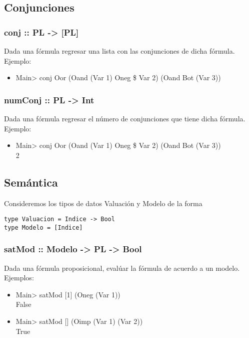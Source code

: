 \documentclass[11pt]{article}
\begin{document}
\subsection{Conjunciones}
\label{sec:orga60673c}
\subsubsection{conj :: PL -> [PL]}
\label{sec:org50aaf73}
Dada una fórmula regresar una lista con las conjunciones de dicha fórmula.\\
Ejemplo: 
\begin{itemize}
\item Main> conj Oor (Oand (Var 1) Oneg \$ Var 2) (Oand Bot (Var 3))\\
[Oand (Var 1) Oneg \$ Var 2, Oand Bot (Var 3)]
\end{itemize}
\subsubsection{numConj :: PL -> Int}
\label{sec:org9cc558c}
Dada una fórmula regresar el número de conjunciones que tiene dicha fórmula.\\
Ejemplo:
\begin{itemize}
\item Main> conj Oor (Oand (Var 1) Oneg \$ Var 2) (Oand Bot (Var 3))\\
2
\end{itemize}
\subsection{Semántica}
\label{sec:orgb4af71c}
Consideremos los tipos de datos Valuación y Modelo de la forma 
\begin{verbatim}
type Valuacion = Indice -> Bool
type Modelo = [Indice]
\end{verbatim}
\subsubsection{satMod :: Modelo -> PL -> Bool}
\label{sec:org76761ac}
Dada una fórmula proposicional, evalúar la fórmula de acuerdo a un modelo.\\
Ejemplos:
\begin{itemize}
\item Main> satMod [1] (Oneg (Var 1))\\
False
\item Main> satMod [] (Oimp (Var 1) (Var 2))\\
True
\end{itemize}
\end{document}

